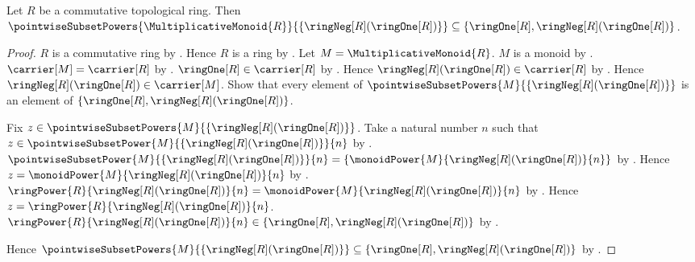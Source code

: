\begin{proposition}\label{topological_ring_negative_one_power_envelope}
    Let $R$ be a commutative topological ring.
    Then $\pointwiseSubsetPowers{\MultiplicativeMonoid{R}}{
        \{\ringNeg[R](\ringOne[R])\}}
        \subseteq\{\ringOne[R],\ringNeg[R](\ringOne[R])\}$.
\end{proposition}
\begin{proof}
    $R$ is a commutative ring by
        .
    Hence $R$ is a ring by .
    Let $M=\MultiplicativeMonoid{R}$.
    $M$ is a monoid by .
    $\carrier[M]=\carrier[R]$ by .
    $\ringOne[R]\in\carrier[R]$ by .
    Hence $\ringNeg[R](\ringOne[R])\in\carrier[R]$ by .
    Hence $\ringNeg[R](\ringOne[R])\in\carrier[M]$.
    Show that every element of
        $\pointwiseSubsetPowers{M}{\{\ringNeg[R](\ringOne[R])\}}$ is an
        element of $\{\ringOne[R],\ringNeg[R](\ringOne[R])\}$.
    \begin{subproof}
        Fix $z\in
            \pointwiseSubsetPowers{M}{\{\ringNeg[R](\ringOne[R])\}}$.
        Take a natural number $n$ such that
            $z\in\pointwiseSubsetPower{M}{
                \{\ringNeg[R](\ringOne[R])\}}{n}$ by
            .
        $\pointwiseSubsetPower{M}{\{\ringNeg[R](\ringOne[R])\}}{n}
            =\{\monoidPower{M}{\ringNeg[R](\ringOne[R])}{n}\}$ by
            .
        Hence $z=\monoidPower{M}{\ringNeg[R](\ringOne[R])}{n}$ by
            .
        $\ringPower{R}{\ringNeg[R](\ringOne[R])}{n}
            =\monoidPower{M}{\ringNeg[R](\ringOne[R])}{n}$ by
            .
        Hence $z=\ringPower{R}{\ringNeg[R](\ringOne[R])}{n}$.
        $\ringPower{R}{\ringNeg[R](\ringOne[R])}{n}
            \in\{\ringOne[R],\ringNeg[R](\ringOne[R])\}$ by
            .
    \end{subproof}
    Hence $\pointwiseSubsetPowers{M}{\{\ringNeg[R](\ringOne[R])\}}
        \subseteq\{\ringOne[R],\ringNeg[R](\ringOne[R])\}$ by
        .
\end{proof}

